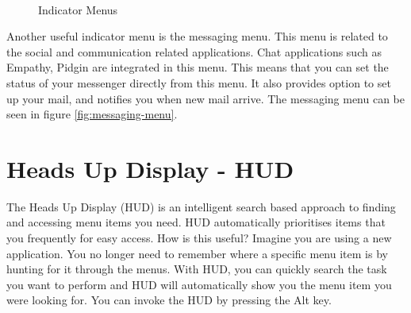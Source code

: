 \begin{figure}[h]	
		\centering		
		~ \hspace{1in}
		\caption{Indicator Menus}
		\label{fig:unity-indicator-menus}
\end{figure}

\par \noindent Another useful indicator menu is the messaging menu. This menu is related to the social and communication related applications. Chat applications such as Empathy, Pidgin are integrated in this menu. This means that you can set the status of your messenger directly from this menu. It also provides option to set up your mail, and notifies you when new mail arrive. The messaging menu can be seen in figure \ref{fig:messaging-menu}.

\section{Heads Up Display - HUD} \label{sect:desktop-hud} 
The Heads Up Display (HUD) is an intelligent search based approach to finding and accessing menu items you need. HUD automatically prioritises items that you frequently for easy access. How is this useful? Imagine you are using a new application. You no longer need to remember where a specific menu item is by hunting for it through the menus. With HUD, you can quickly search the task you want to perform and HUD will automatically show you the menu item you were looking for.  You can invoke the HUD by pressing the Alt key.\\

